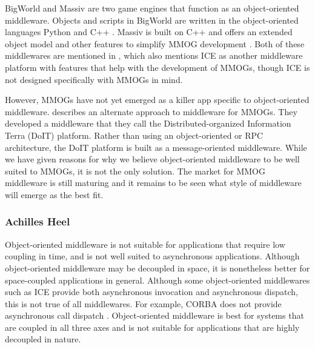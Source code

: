 \documentclass{acm_proc_article-sp}
\begin{document}
BigWorld and Massiv  are two game engines that function as an object-oriented middleware.  Objects and scripts in BigWorld are written in the object-oriented languages Python and C++ \cite{bigworldtech}.  Massiv is built on C++ and offers an extended object model and other features to simplify MMOG development \cite{massiv}.  Both of these middlewares are mentioned in \cite{Hsiao:2005p8709}, which also mentions ICE as another middleware platform with features that help with the development of MMOGs, though ICE is not designed specifically with MMOGs in mind.


However, MMOGs have not yet emerged as a killer app specific to object-oriented middleware.  \cite{Hsiao:2005p8709} describes an alternate approach to middleware for MMOGs.  They developed a middleware that they call the Distributed-organized Information Terra (DoIT) platform.  Rather than using an object-oriented or RPC architecture, the DoIT platform is built as a message-oriented middleware.  While we have given reasons for why we believe object-oriented middleware to be well suited to MMOGs, it is not the only solution.  The market for MMOG middleware is still maturing and it remains to be seen what style of middleware will emerge as the best fit.


\subsubsection{Achilles Heel}
\label{sec:appsobjbad}


Object-oriented middleware is not suitable for applications that require low coupling in time, and is not well suited to asynchronous applications.  Although object-oriented middleware may be decoupled in space, it is nonetheless better for space-coupled applications in general.  Although some object-oriented middlewares such as ICE provide both asynchronous invocation and asynchronous dispatch, this is not true of all middlewares.  For example, CORBA does not provide asynchronous call dispatch \cite{Henning:2004p8372}.  Object-oriented middleware is best for systems that are coupled in all three axes and is not suitable for applications that are highly decoupled in nature.
\end{document}
